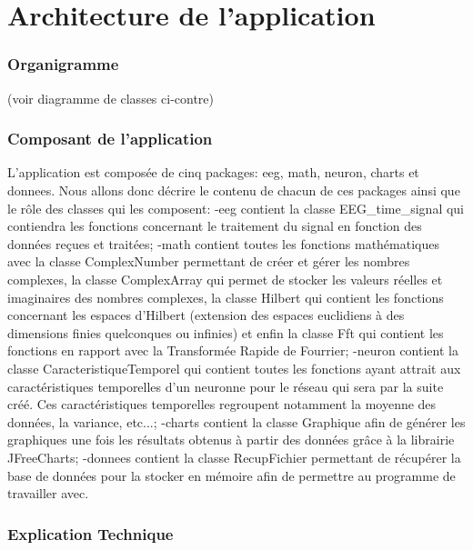 \part{Architecture de l'application} %
\label{prt:architecture_ _de_ _l_'_application_}
	\section{Organigramme} %
	\label{sec:organigramme}
	
	(voir diagramme de classes ci-contre)
	

	\section{Composant de l'application} %
	\label{sec:composant_de_l_application}
	
	L'application est composée de cinq packages: eeg, math, neuron, charts et donnees. Nous allons donc décrire le contenu de chacun de ces packages ainsi que le rôle des classes qui les composent:
	-eeg contient la classe EEG_time_signal qui contiendra les fonctions concernant le traitement du signal en fonction des données reçues et traitées;
	-math contient toutes les fonctions mathématiques avec la classe ComplexNumber permettant de créer et gérer les nombres complexes, la classe ComplexArray qui permet de stocker les valeurs réelles et imaginaires des nombres complexes, la classe Hilbert qui contient les fonctions concernant les espaces d'Hilbert (extension des espaces euclidiens à des dimensions finies quelconques ou infinies) et enfin la classe Fft qui contient les fonctions en rapport avec la Transformée Rapide de Fourrier;
	-neuron contient la classe CaracteristiqueTemporel qui contient toutes les fonctions ayant attrait aux caractéristiques temporelles d'un neuronne pour le réseau qui sera par la suite créé. Ces caractéristiques temporelles regroupent notamment la moyenne des données, la variance, etc...;
	-charts contient la classe Graphique afin de générer les graphiques une fois les résultats obtenus à partir des données grâce à la librairie JFreeCharts;
	-donnees contient la classe RecupFichier permettant de récupérer la base de données pour la stocker en mémoire afin de permettre au programme de travailler avec.
	

	\section{Explication Technique} %
	\label{sec:explication_technique}
		
